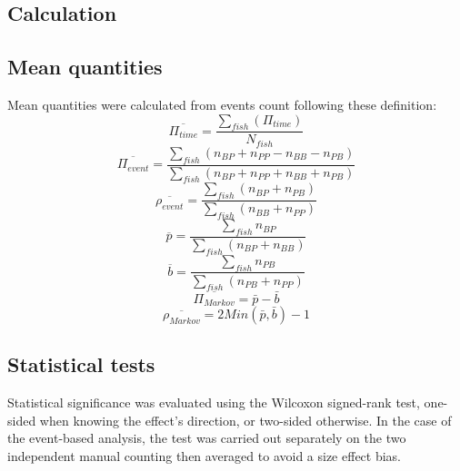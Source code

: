\begin{appendices}
  \chapter{Calculation}
   \label{mean_quantities}
    \section{Mean quantities}
    Mean quantities were calculated from events count following these definition:
    \begin{equation}
      \overline{\Pi_{time}} = \frac{\sum_{fish}^{}(\Pi_{time})}{N_{fish}}
      \label{mean_pi_time}
    \end{equation}
    \begin{equation}
      \overline{\Pi_{event}} = \frac{\sum_{fish}^{}(n_{BP} + n_{PP} - n_{BB} - n_{PB})}{\sum_{fish}^{}(n_{BP} + n_{PP} + n_{BB} + n_{PB})}
      \label{mean_pi_event}
    \end{equation}
    \begin{equation}
      \overline{\rho_{event}} =\frac{\sum_{fish}^{}(n_{BP} + n_{PB})}{\sum_{fish}^{}(n_{BB} + n_{PP})}
      \label{mean_r_event}
    \end{equation}
    \begin{equation}
      \overline{p} = \frac{\sum_{fish}^{}n_{BP}}{\sum_{fish}^{}(n_{BP} + n_{BB})}
    \end{equation}
    \begin{equation}
      \overline{b} = \frac{\sum_{fish}^{}n_{PB}}{\sum_{fish}^{}(n_{PB} + n_{PP})}
    \end{equation}
    \begin{equation}
      \overline{\Pi_{Markov}} = \bar{p} - \bar{b}
      \label{mean_pi_markov}
    \end{equation}
    \begin{equation}
      \overline{\rho_{Markov}} = 2Min(\bar{p}, \bar{b}) - 1
      \label{mean_r_markov}
    \end{equation}

    \section{Statistical tests}
    Statistical significance was evaluated using the Wilcoxon signed-rank test, one-sided when knowing the effect's direction, or two-sided otherwise. In the case of the event-based analysis, the test was carried out separately on the two independent manual counting then averaged to avoid a size effect bias.


\end{appendices}

